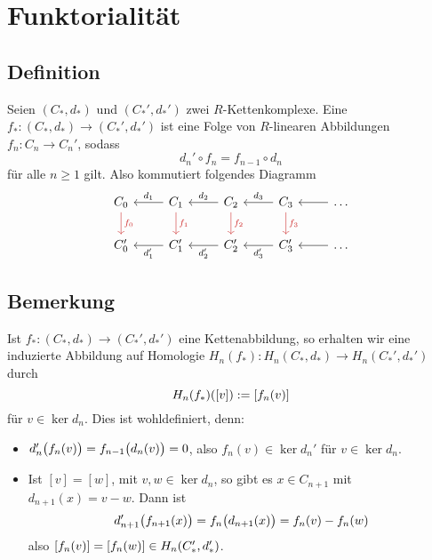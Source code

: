 \section{Funktorialität} %
\label{sec:6}

\subsection[Definition: $R$-Kettenabbildung]{Definition} %
\label{sub:61}
Seien $(C_*,d_*)$ und $(C_*',d_*')$ zwei $R$-Kettenkomplexe. Eine 
$f_* \colon (C_*,d_*) \to (C_*',d_*')$ ist eine Folge von $R$-linearen Abbildungen $f_n \colon C_n \to C_n'$, sodass
\[
	d_n' \circ f_n = f_{n-1} \circ d_n
\]
für alle $n\ge 1$ gilt. Also kommutiert folgendes Diagramm
\[
	\begin{tikzcd}[sep=normal]
		C_0 \dar["f_0", Firebrick3] & C_1 \lar["d_1"'] \dar["f_1", Firebrick3] & C_2 \lar["d_2"'] \dar["f_2", Firebrick3]& C_3 \lar["d_3"'] \dar["f_3", Firebrick3]& \ldots \lar \\
		C_0' & C_1' \lar["d_1'"]  & C_2' \lar["d_2'"]& C_3' \lar["d_3'"]& \ldots \lar
	\end{tikzcd}
\]


\subsection[Bemerkung: Induzierte Abbildung einer Kettenabbildung auf Homologie]{Bemerkung} %
\label{sub:62}
Ist $f_* \colon (C_*,d_*) \to (C_*',d_*')$ eine Kettenabbildung, so erhalten wir eine induzierte Abbildung auf Homologie $H_n(f_*) \colon H_n(C_*,d_*) \to H_n(C_*',d_*')$ durch
\[
	H_n(f_*) \enbrace*{[v]} := \benbrace*{f_n(v)}  
\]
für $v \in \ker d_n$. Dies ist wohldefiniert, denn:
\begin{itemize}
	\item $d_n' \enbrace[\big]{f_n(v)} = f_{n-1} \enbrace[\big]{d_n(v)} = 0 $, also $f_n(v) \in \ker d_n'$ für $v \in \ker d_n$.
	\item Ist $[v]=[w]$, mit $v,w \in\ker d_n$, so gibt es $x \in C_{n+1}$ mit $d_{n+1}(x)=v-w$. Dann ist 
	\[
		d_{n+1}'\enbrace[\big]{f_{n+1}(x)} = f_n \enbrace[\big]{d_{n+1}(x)} = f_n(v)- f_n(w) 
	\]
	also $\benbrace*{f_n(v)} = \benbrace*{f_n(w)} \in H_n(C_*',d_*')$.
\end{itemize}

